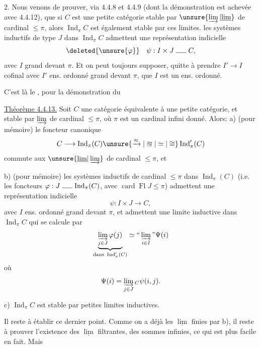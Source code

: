2. Nous venons de prouver, via 4.4.8 et 4.4.9 (dont la démonstration est achevée avec 4.4.12), que  si $C$ est une petite catégorie stable par $\unsure{\varinjlim|\underline{\lim}}$ de cardinal $\leq\pi$, alors $\operatorname{Ind}_{\pi}C$ est également stable par ces limites.    les  systèmes inductifs de type $J$ dans $\operatorname{Ind}_{\pi}C$  admettent une représentation indicielle
\[
\deleted{\unsure{\varphi}}\quad\psi:I\times J\mathrel{\rule{1.5em}{0.4pt}}C,
\]
avec $I$ grand devant $\pi$. Et on peut toujours supposer, quitte à prendre $I'\longrightarrow I$ cofinal avec $I'$ ens. ordonné grand devant $\pi$, que $I$ est  un ens. ordonné.

C'est là le  , pour la démonstration du

\uline{Théorème 4.4.13.} Soit $C$ une catégorie équivalente à une petite catégorie, et stable par $\varinjlim$ de cardinal $\leq\pi$, où $\pi$ est un cardinal infini donné. Alors: 
a) (pour mémoire) le foncteur canonique
\[
C\longrightarrow\operatorname{Ind}_{\pi}(C)\unsure{\xrightarrow{\approx}|\approxeq|\simeq|\cong}\operatorname{Ind}'_{\pi}(C)
\]
commute aux $\unsure{\underline{\lim}|\varinjlim}$ de cardinal $\leq\pi$, et

b) (pour mémoire) les systèmes inductifs de cardinal $\leq\pi$ dans $\operatorname{Ind}_{\pi}(C)$ (i.e. les foncteurs $\varphi:J\mathrel{\rule{1.5em}{0.4pt}}\operatorname{Ind}_{\pi}(C)$, avec $\operatorname{card}\operatorname{Fl}J\leq\pi$) admettent une représentation indicielle
\[
\psi:I\times J\longrightarrow C,
\]
avec $I$ ens. ordonné grand devant $\pi$, et admettent une limite inductive dans $\operatorname{Ind}_{\pi}C$ qui se calcule par
\[
\underbrace{\varinjlim_{j\in J}\varphi(j)}_{\text{dans }\operatorname{Ind}'_{\pi}(C)}\simeq\text{``}\varinjlim_{i\in I}\text{''}\Psi(i)
\]
où
\[
\Psi(i)=\varinjlim_{j\in J}{}_{C}\psi(i,j).
\]

c) $\operatorname{Ind}_{\pi}C$ est stable par petites limites inductives.


Il reste à établir ce dernier point. Comme on a déjà les $\underline{\lim}$ finies par b), il reste à prouver l'existence des  $\underline{\lim}$ filtrantes,    des sommes infinies, ce qui est plus facile en fait. Mais
